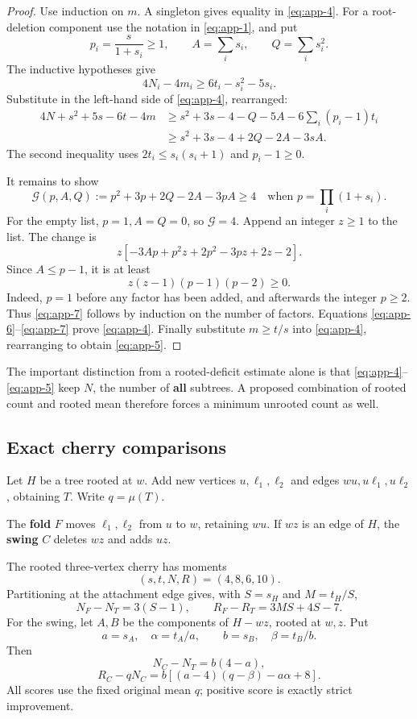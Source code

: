 \documentclass[11pt,reqno]{amsart}
\theoremstyle{plain}
\begin{document}
\begin{proof} Use induction on \(m\). A singleton gives equality in \eqref{eq:app-4}. For a root-deletion component use the notation in \eqref{eq:app-1}, and put \[
p_i=\frac{s}{1+s_i}\ge1,\qquad A=\sum_i s_i,\qquad Q=\sum_i s_i^2.
\] The inductive hypotheses give \[
4N_i-4m_i\ge6t_i-s_i^2-5s_i.
\] Substitute in the left-hand side of \eqref{eq:app-4}, rearranged: \[
\begin{aligned}
4N+s^2+5s-6t-4m
&\ge s^2+3s-4-Q-5A
       -6\sum_i(p_i-1)t_i\\
&\ge s^2+3s-4+2Q-2A-3sA.
\end{aligned}
\tag{B.6}\label{eq:app-6}
\] The second inequality uses \(2t_i\le s_i(s_i+1)\) and \(p_i-1\ge0\).

It remains to show \[
\mathcal G(p,A,Q):=p^2+3p+2Q-2A-3pA\ge4
\quad\text{when }p=\prod_i(1+s_i).
\tag{B.7}\label{eq:app-7}
\] For the empty list, \(p=1,A=Q=0\), so \(\mathcal G=4\). Append an integer \(z\ge1\) to the list. The change is \[
z[-3Ap+p^2z+2p^2-3pz+2z-2].
\] Since \(A\le p-1\), it is at least \[
z(z-1)(p-1)(p-2)\ge0.
\] Indeed, \(p=1\) before any factor has been added, and afterwards the integer \(p\ge2\). Thus \eqref{eq:app-7} follows by induction on the number of factors. Equations \eqref{eq:app-6}--\eqref{eq:app-7} prove \eqref{eq:app-4}. Finally substitute \(m\ge t/s\) into \eqref{eq:app-4}, rearranging to obtain \eqref{eq:app-5}. \end{proof}

The important distinction from a rooted-deficit estimate alone is that \eqref{eq:app-4}--\eqref{eq:app-5} keep \(N\), the number of \textbf{all} subtrees. A proposed combination of rooted count and rooted mean therefore forces a minimum unrooted count as well.

\subsection{Exact cherry comparisons}\label{b.3.-exact-cherry-comparisons}

Let \(H\) be a tree rooted at \(w\). Add new vertices \(u,\ell_1,\ell_2\) and edges \(wu,u\ell_1,u\ell_2\), obtaining \(T\). Write \(q=\mu(T)\).

The \textbf{fold} \(F\) moves \(\ell_1,\ell_2\) from \(u\) to \(w\), retaining \(wu\). If \(wz\) is an edge of \(H\), the \textbf{swing} \(C\) deletes \(wz\) and adds \(uz\).

The rooted three-vertex cherry has moments \[
(s,t,N,R)=(4,8,6,10).
\] Partitioning at the attachment edge gives, with \(S=s_H\) and \(M=t_H/S\), \[
N_F-N_T=3(S-1),\qquad R_F-R_T=3MS+4S-7.
\tag{B.8}\label{eq:app-8}
\] For the swing, let \(A,B\) be the components of \(H-wz\), rooted at \(w,z\). Put \[
a=s_A,\quad \alpha=t_A/a,\qquad b=s_B,\quad \beta=t_B/b.
\] Then \[
N_C-N_T=b(4-a),
\] \[
R_C-qN_C=b[(a-4)(q-\beta)-a\alpha+8].
\tag{B.9}\label{eq:app-9}
\] All scores use the fixed original mean \(q\); positive score is exactly strict improvement.
\end{document}
